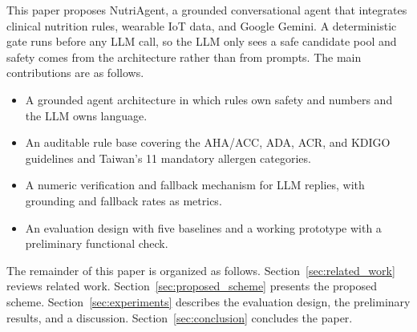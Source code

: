 This paper proposes NutriAgent, a grounded conversational agent that integrates
clinical nutrition rules, wearable IoT data, and Google Gemini. A deterministic
gate runs before any LLM call, so the LLM only sees a safe candidate pool and
safety comes from the architecture rather than from prompts. The main
contributions are as follows.
\begin{itemize}
    \item A grounded agent architecture in which rules own safety and numbers
    and the LLM owns language.
    \item An auditable rule base covering the AHA/ACC, ADA, ACR, and KDIGO
    guidelines and Taiwan's 11 mandatory allergen categories.
    \item A numeric verification and fallback mechanism for LLM replies, with
    grounding and fallback rates as metrics.
    \item An evaluation design with five baselines and a working prototype with
    a preliminary functional check.
\end{itemize}

The remainder of this paper is organized as follows.
Section~\ref{sec:related_work} reviews related work.
Section~\ref{sec:proposed_scheme} presents the proposed scheme.
Section~\ref{sec:experiments} describes the evaluation design, the preliminary
results, and a discussion. Section~\ref{sec:conclusion} concludes the paper.
